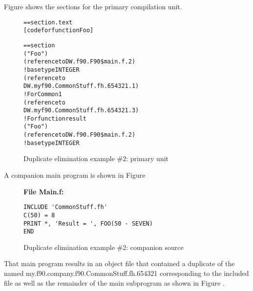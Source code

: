 Figure 
shows the sections for the primary compilation unit.

\begin{figure}
\begin{dwflisting}
\begin{alltt}
== section .text
    [code for function Foo]

== section 
            ("Foo")
            (reference to DW.f90.F90\$main.f.2)
                ! base type INTEGER
                (reference to
                    DW.myf90.CommonStuff.fh.654321.1)
             ! For Common1
                (reference to
                    DW.myf90.CommonStuff.fh.654321.3)
             ! For function result
                ("Foo")
                    (reference to DW.f90.F90\$main.f.2)
                        ! base type INTEGER
\end{alltt}
\end{dwflisting}
\caption{Duplicate elimination example \#2: primary unit}
\label{fig:duplicateeliminationexample2primaryunit}
\end{figure}

A companion main program is shown in 
Figure 

\begin{figure}
\textbf{File Main.f:} 
\begin{lstlisting}[numbers=none]
INCLUDE 'CommonStuff.fh'
C(50) = 8
PRINT *, 'Result = ', FOO(50 - SEVEN)
END
\end{lstlisting}
\caption{Duplicate elimination example \#2: companion source }
\label{fig:duplicateeliminationexample2companionsource}
\end{figure}

That main program results in an object file that
contained a duplicate of the  named
my.f90.company.f90.CommonStuff.fh.654321 
corresponding to the
included file as well as the remainder of the main subprogram
as shown in 
Figure .

